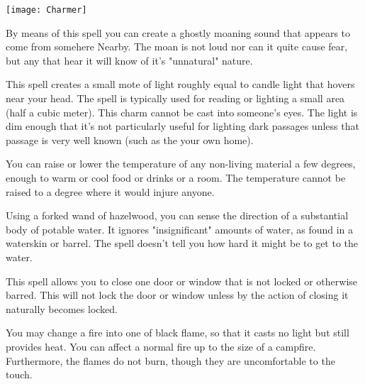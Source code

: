 {  \begin{center}
  \texttt{[image: Charmer]}
  \end{center}


  \cbreak



  By means of this spell you can create a ghostly moaning sound that appears to come from somehere Nearby. The moan is not loud nor can it quite cause fear, but any that hear it will know of it's "unnatural" nature. 


  This spell creates a small mote of light roughly equal to candle light that hovers near your head. The spell is typically used for reading or lighting a small area (half a cubic meter). This charm cannot be cast into someone's eyes. The light is dim enough that it's not particularly useful for lighting dark passages unless that passage is very well known (such as the your own home). 


  You can raise or lower the temperature of any non-living material a few degrees, enough to warm or cool food or drinks or a room.  The temperature cannot be raised to a degree where it would injure anyone.



  Using a forked wand of hazelwood, you can sense the direction of a substantial body of potable water.  It ignores "insignificant" amounts of water, as found in a waterskin or barrel.  The spell doesn’t tell you how hard it might be to get to the water.


  This spell allows you to close one door or window that is not locked or otherwise barred. This will not lock the door or window unless by the action of closing it naturally becomes locked. 


  You may change a fire into one of black flame, so that it casts no light but still provides heat.  You can affect a normal fire up to the size of a campfire.  Furthermore, the flames do not burn, though they are uncomfortable to the touch.


}
